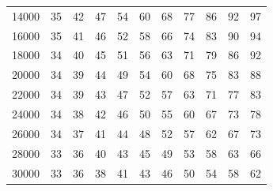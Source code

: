 \documentclass[a4paper, 10pt]{article}
\begin{document}
\begin{table}[!tbp]
\begin{center}
\begin{tabular}{lllllllllll}
14000& 35& 42& 47&\cellcolor{gray90} 54&\cellcolor{gray80} 60&\cellcolor{gray80} 68&\cellcolor{gray70} 77&\cellcolor{gray60} 86&\cellcolor{gray50} 92&\cellcolor{gray50} 97\tabularnewline
16000& 35& 41& 46&\cellcolor{gray90} 52&\cellcolor{gray90} 58&\cellcolor{gray80} 66&\cellcolor{gray70} 74&\cellcolor{gray60} 83&\cellcolor{gray60} 90&\cellcolor{gray50} 94\tabularnewline
18000& 34& 40& 45&\cellcolor{gray90} 51&\cellcolor{gray90} 56&\cellcolor{gray80} 63&\cellcolor{gray70} 71&\cellcolor{gray70} 79&\cellcolor{gray60} 86&\cellcolor{gray50} 92\tabularnewline
20000& 34& 39& 44& 49&\cellcolor{gray90} 54&\cellcolor{gray80} 60&\cellcolor{gray80} 68&\cellcolor{gray70} 75&\cellcolor{gray60} 83&\cellcolor{gray60} 88\tabularnewline
22000& 34& 39& 43& 47&\cellcolor{gray90} 52&\cellcolor{gray90} 57&\cellcolor{gray80} 63&\cellcolor{gray70} 71&\cellcolor{gray70} 77&\cellcolor{gray60} 83\tabularnewline
24000& 34& 38& 42& 46& 50&\cellcolor{gray90} 55&\cellcolor{gray90} 60&\cellcolor{gray80} 67&\cellcolor{gray70} 73&\cellcolor{gray70} 78\tabularnewline
26000& 34& 37& 41& 44& 48&\cellcolor{gray90} 52&\cellcolor{gray90} 57&\cellcolor{gray80} 62&\cellcolor{gray80} 67&\cellcolor{gray70} 73\tabularnewline
28000& 33& 36& 40& 43& 45& 49&\cellcolor{gray90} 53&\cellcolor{gray90} 58&\cellcolor{gray80} 63&\cellcolor{gray80} 66\tabularnewline
30000& 33& 36& 38& 41& 43& 46& 50&\cellcolor{gray90} 54&\cellcolor{gray90} 58&\cellcolor{gray80} 62\tabularnewline
\hline
\end{tabular}
\end{center}
\end{table}
\end{document}
